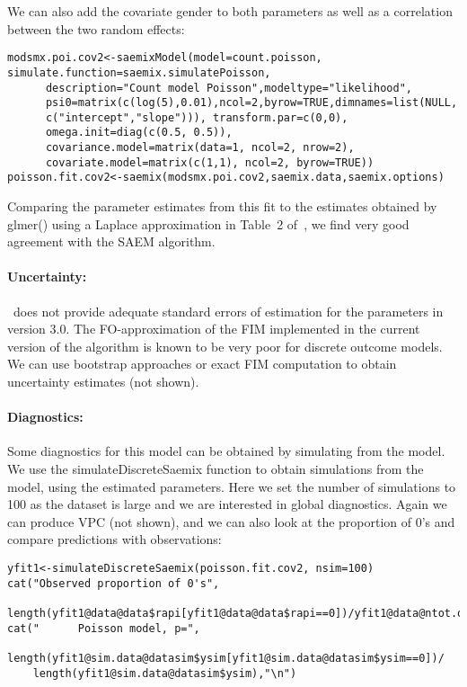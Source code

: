 We can also add the covariate gender to both parameters as well as a correlation between the two random effects:
\begin{verbatim}
modsmx.poi.cov2<-saemixModel(model=count.poisson, simulate.function=saemix.simulatePoisson,
      description="Count model Poisson",modeltype="likelihood",   
      psi0=matrix(c(log(5),0.01),ncol=2,byrow=TRUE,dimnames=list(NULL, 
      c("intercept","slope"))), transform.par=c(0,0), 
      omega.init=diag(c(0.5, 0.5)), 
      covariance.model=matrix(data=1, ncol=2, nrow=2),
      covariate.model=matrix(c(1,1), ncol=2, byrow=TRUE))
poisson.fit.cov2<-saemix(modsmx.poi.cov2,saemix.data,saemix.options)
\end{verbatim}
Comparing the parameter estimates from this fit to the estimates obtained by {\sf glmer()} using a Laplace approximation in Table~2 of~\cite{Atkins13}, we find very good agreement with the SAEM algorithm.

\paragraph{Uncertainty:} \saemix~does not provide adequate standard errors of estimation for the parameters in version 3.0. The FO-approximation of the FIM implemented in the current version of the algorithm is known to be very poor for discrete outcome models. We can use bootstrap approaches or exact FIM computation to obtain uncertainty estimates (not shown).

\paragraph{Diagnostics:} Some diagnostics for this model can be obtained by simulating from the model. We use the {\sf simulateDiscreteSaemix} function to obtain simulations from the model, using the estimated parameters. Here we set the number of simulations to 100 as the dataset is large and we are interested in global diagnostics. Again we can produce VPC (not shown), and we can also look at the proportion of 0's and compare predictions with observations:
\begin{verbatim}
yfit1<-simulateDiscreteSaemix(poisson.fit.cov2, nsim=100)
cat("Observed proportion of 0's", 
     length(yfit1@data@data$rapi[yfit1@data@data$rapi==0])/yfit1@data@ntot.obs,"\n")
cat("      Poisson model, p=",
    length(yfit1@sim.data@datasim$ysim[yfit1@sim.data@datasim$ysim==0])/
    length(yfit1@sim.data@datasim$ysim),"\n") 
\end{verbatim}

